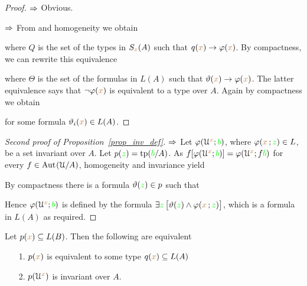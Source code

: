 \vspace*{-\parskip}
\begin{proof}
$\Rightarrow$ Obvious.

$\Rightarrow$ From  and homogeneity we obtain


where $Q$ is the set of the types in $S_{\color{brown} x}(A)$ such that $q({\color{brown} x})\rightarrow\varphi({\color{brown} x})$. 
By compactness, we can rewrite this equivalence 


where $\Theta$ is the set of the formulas in $L(A)$ such that $\vartheta({\color{brown} x})\rightarrow\varphi({\color{brown} x})$.
The latter equivalence says that $\neg\varphi({\color{brown} x})$ is equivalent to a type over $A$. 
Again by compactness we obtain 


for some formula $\vartheta_i({\color{brown} x})\in L(A)$.
\end{proof}

\begin{proof}[Second proof of Proposition~\ref{prop_inv_def}] 
   $\Rightarrow$ 
   Let $\varphi(\EuScript U^{\color{brown} x};{\color{green} b})$, where $\varphi({\color{brown} x}\,;{\color{green} z})\in L$, be a set invariant over $A$.
   Let $p({\color{green} z})={\rm tp}({\color{green} b}/A)$.
   As $f[\varphi(\EuScript U^{\color{brown} x};{\color{green} b})]=\varphi(\EuScript U^{\color{brown} x};f{\color{green} b})$ for every $f\in{\rm Aut\kern.15ex}(\EuScript U/A)$, homogeneity and invariance yield
   

By compactness there is a formula $\vartheta({\color{green} z})\in p$ such that 


Hence  $\varphi(\EuScript U^{\color{brown} x};{\color{green} b})$ is defined by the formula $\exists {\color{green}z}\,\big[\vartheta({\color{green} z})\wedge\varphi({\color{brown} x}\,;{\color{green} z})\big]$, which is a formula in $L(A)$ as required.
\end{proof}

\begin{proposition}\label{prop_inv_types}
Let $p({\color{brown} x})\subseteq L(B)$.
Then the following are equivalent
\begin{itemize}
 \item[1.] $p({\color{brown} x})$ is equivalent to some type $q({\color{brown} x})\subseteq L(A)$
 \item[2.] $p(\EuScript U^{\color{brown} x})$ is invariant over $A$.
\end{itemize}
\end{proposition}

